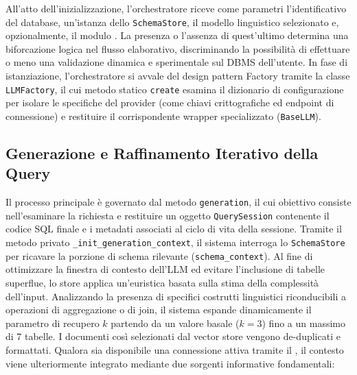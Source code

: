 All'atto dell'inizializzazione, l'orchestratore riceve come
parametri l'identificativo del database, un'istanza dello
\texttt{SchemaStore}, il modello linguistico selezionato e,
opzionalmente, il modulo . La presenza o
l'assenza di quest'ultimo determina una biforcazione logica nel
flusso elaborativo, discriminando la possibilità di effettuare o
meno una validazione dinamica e sperimentale sul DBMS dell'utente.
In fase di istanziazione, l'orchestratore si avvale del design
pattern Factory tramite la classe \texttt{LLMFactory}, il cui
metodo statico \texttt{create} esamina il dizionario di
configurazione per isolare le specifiche del provider (come chiavi
crittografiche ed endpoint di connessione) e restituire il
corrispondente wrapper specializzato (\texttt{BaseLLM}).

\subsection{Generazione e Raffinamento Iterativo della
Query}\label{generazione-e-raffinamento-iterativo-della-query}

Il processo principale è governato dal metodo \texttt{generation}, il
cui obiettivo consiste nell'esaminare la richiesta e restituire un
oggetto \texttt{QuerySession} contenente il codice SQL finale e i
metadati associati al ciclo di vita della sessione. Tramite il metodo
privato \texttt{\_init\_generation\_context}, il sistema interroga lo
\texttt{SchemaStore} per ricavare la porzione di schema rilevante
(\texttt{schema\_context}). Al fine di ottimizzare la finestra di
contesto dell'LLM ed evitare l'inclusione di tabelle superflue, lo store
applica un'euristica basata sulla stima della complessità dell'input.
Analizzando la presenza di specifici costrutti linguistici riconducibili
a operazioni di aggregazione o di join, il sistema espande dinamicamente
il parametro di recupero \(k\) partendo da un valore basale (\(k=3\))
fino a un massimo di 7 tabelle. I documenti così selezionati dal vector
store vengono de-duplicati e formattati. Qualora sia disponibile una
connessione attiva tramite il , il contesto
viene ulteriormente integrato mediante due sorgenti informative
fondamentali:

